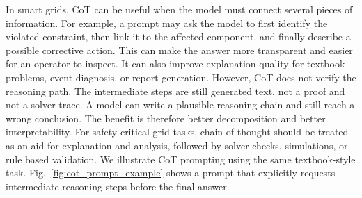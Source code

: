 \documentclass[journal,onecolumn]{IEEEtran} %
\begin{document}
In smart grids, CoT can be useful when the model must connect several pieces of information. For example, a prompt may ask the model to first identify the violated constraint, then link it to the affected component, and finally describe a possible corrective action. This can make the answer more transparent and easier for an operator to inspect. It can also improve explanation quality for textbook problems, event diagnosis, or report generation.
However, CoT does not verify the reasoning path. The intermediate steps are still generated text, not a proof and not a solver trace. A model can write a plausible reasoning chain and still reach a wrong conclusion. The benefit is therefore better decomposition and better interpretability. For safety critical grid tasks, chain of thought should be treated as an aid for explanation and analysis, followed by solver checks, simulations, or rule based validation. We illustrate CoT prompting using the same textbook-style task. Fig.~\ref{fig:cot_prompt_example} shows a prompt that explicitly requests intermediate reasoning steps before the final answer.
\end{document}
